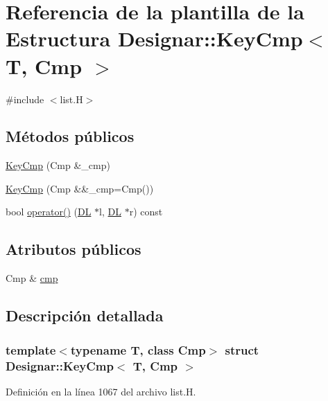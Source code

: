 \hypertarget{struct_designar_1_1_key_cmp}{}\section{Referencia de la plantilla de la Estructura Designar\+:\+:Key\+Cmp$<$ T, Cmp $>$}
\label{struct_designar_1_1_key_cmp}


{\ttfamily \#include $<$list.\+H$>$}

\subsection*{Métodos públicos}
\begin{DoxyCompactItemize}
\item 
\hyperlink{struct_designar_1_1_key_cmp_a8addea491666ad6d859113f8a03597c7}{Key\+Cmp} (Cmp \&\+\_\+cmp)
\item 
\hyperlink{struct_designar_1_1_key_cmp_a9e5e19bf38ff54d6c3dad828ceb63cd2}{Key\+Cmp} (Cmp \&\&\+\_\+cmp=Cmp())
\item 
bool \hyperlink{struct_designar_1_1_key_cmp_aa48c4fb700b4ba3bd243c3426288455e}{operator()} (\hyperlink{class_designar_1_1_d_l}{DL} $\ast$l, \hyperlink{class_designar_1_1_d_l}{DL} $\ast$r) const
\end{DoxyCompactItemize}
\subsection*{Atributos públicos}
\begin{DoxyCompactItemize}
\item 
Cmp \& \hyperlink{struct_designar_1_1_key_cmp_a459613d03deb91c821f26cfafdd93dab}{cmp}
\end{DoxyCompactItemize}


\subsection{Descripción detallada}
\subsubsection*{template$<$typename T, class Cmp$>$\newline
struct Designar\+::\+Key\+Cmp$<$ T, Cmp $>$}



Definición en la línea 1067 del archivo list.\+H.



